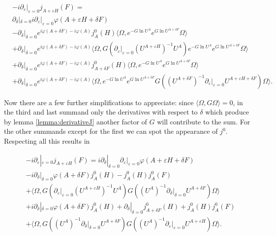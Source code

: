 \documentclass[b5paper,draft,openbib,12pt]{memoir}
\begin{document}
\begin{align*}
&-i\partial_\varepsilon |_{\varepsilon=0} j_{A+\varepsilon H}(F)=\\
&\partial_\delta |_{\delta=0}   i\partial_\varepsilon |_{\varepsilon=0}\varphi(A+\varepsilon H + \delta F)\\
&-\partial_\delta |_{\delta=0} e^{i\varphi(A + \delta F)-i\varphi(A)}  j^0_{A}(H) 
\langle \Omega, e^{-G \ln U^{A}} e^{G \ln U^{A + \delta F}}\Omega \rangle \\
&+\partial_\delta |_{\delta=0} e^{i\varphi(A + \delta F)-i\varphi(A)} \langle \Omega,
 G \left(\partial_\varepsilon |_{\varepsilon=0} \left(U^{A+\varepsilon H}\right)^{-1} U^A\right) e^{-G \ln U^{A}} e^{G \ln U^{A + \delta F}}  \Omega \rangle\\
&+\partial_\delta |_{\delta=0} e^{i\varphi(A + \delta F)-i\varphi(A)} j^0_{A+\delta F}(H)
\langle \Omega, e^{-G \ln U^{A}} e^{G \ln U^{A+ \delta F}}\Omega \rangle\\
&+\partial_\delta |_{\delta=0} e^{i\varphi(A + \delta F)-i\varphi(A)} 
\langle \Omega, e^{-G \ln U^{A}} e^{G \ln U^{A+ \delta F}}G\left( \left(U^{A+\delta F}\right)^{-1}\partial_\varepsilon |_{\varepsilon=0} U^{A+\varepsilon H + \delta F} \right) \Omega \rangle.
\end{align*}

Now there are a few further simplifications to appreciate: since \(\langle \Omega, G \Omega \rangle=0\), in the third and last summand only the derivatives with respect to \(\delta\) which produce by lemma \ref{lemma:derivativeJ} another factor of \(G\)  will contribute to the sum.
 For the other summands except for the first we can spot the appearance of \(j^0\). Respecting all this results in

\begin{align*}
&-i\partial_\varepsilon |_{\varepsilon=0} j_{A+\varepsilon H}(F)=
i\partial_\delta |_{\delta=0}   \partial_\varepsilon |_{\varepsilon=0}\varphi(A+\varepsilon H + \delta F)\\
&-i\partial_\delta |_{\delta=0}\varphi(A + \delta F)j^0_{A}(H) -  j^0_{A}(H) j^0_A(F)\\
&+\langle \Omega,
 G \left(\partial_\varepsilon |_{\varepsilon=0} \left(U^{A+\varepsilon H}\right)^{-1} U^A\right) G\left( \left(U^{A}\right)^{-1}\partial_\delta |_{\delta=0} U^{A +\delta F} \right)  \Omega \rangle\\
&+i\partial_\delta |_{\delta=0} \varphi(A + \delta F) j^0_{A}(H)
+\partial_\delta |_{\delta=0}  j^0_{A+\delta F}(H)
+ j^0_{A}(H)j^0_A(F)\\
&+\langle \Omega, G\left( \left(U^{A}\right)^{-1}\partial_\delta |_{\delta=0} U^{A + \delta F} \right) G\left( \left(U^{A}\right)^{-1}\partial_\varepsilon |_{\varepsilon=0} U^{A+\varepsilon H} \right) \Omega \rangle.
\end{align*}
\end{document}
